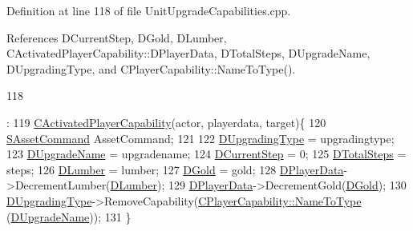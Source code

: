 Definition at line 118 of file Unit\+Upgrade\+Capabilities.\+cpp.



References D\+Current\+Step, D\+Gold, D\+Lumber, C\+Activated\+Player\+Capability\+::\+D\+Player\+Data, D\+Total\+Steps, D\+Upgrade\+Name, D\+Upgrading\+Type, and C\+Player\+Capability\+::\+Name\+To\+Type().


\begin{DoxyCode}
118                                                                                                            
                                                                                                                  
                                                                                        :
119 \hyperlink{classCActivatedPlayerCapability_a1ece00ffb6a7b925c84dd94a7407a0d1}{CActivatedPlayerCapability}(actor, playerdata, target)\{
120     \hyperlink{structSAssetCommand}{SAssetCommand} AssetCommand;
121     
122     \hyperlink{classCPlayerCapabilityUnitUpgrade_1_1CActivatedCapability_a028e222f2adc8a1035090487c93b358b}{DUpgradingType} = upgradingtype;
123     \hyperlink{classCPlayerCapabilityUnitUpgrade_1_1CActivatedCapability_acb0261591d692393b3c864d75edc799f}{DUpgradeName} = upgradename;
124     \hyperlink{classCPlayerCapabilityUnitUpgrade_1_1CActivatedCapability_a3ffaf9372ee622c3ef439396dfd00db6}{DCurrentStep} = 0;
125     \hyperlink{classCPlayerCapabilityUnitUpgrade_1_1CActivatedCapability_a56d9f9fd76c8757955e84ae8f56d5337}{DTotalSteps} = steps;
126     \hyperlink{classCPlayerCapabilityUnitUpgrade_1_1CActivatedCapability_aa4de5f57ea9d8dd85d7e6f62015c4a8d}{DLumber} = lumber;
127     \hyperlink{classCPlayerCapabilityUnitUpgrade_1_1CActivatedCapability_a259a99f41ef918edf79f6827dec06559}{DGold} = gold;
128     \hyperlink{classCActivatedPlayerCapability_a9bf27c322a73f4b11c8183cc1973c3d8}{DPlayerData}->DecrementLumber(\hyperlink{classCPlayerCapabilityUnitUpgrade_1_1CActivatedCapability_aa4de5f57ea9d8dd85d7e6f62015c4a8d}{DLumber});
129     \hyperlink{classCActivatedPlayerCapability_a9bf27c322a73f4b11c8183cc1973c3d8}{DPlayerData}->DecrementGold(\hyperlink{classCPlayerCapabilityUnitUpgrade_1_1CActivatedCapability_a259a99f41ef918edf79f6827dec06559}{DGold});
130     \hyperlink{classCPlayerCapabilityUnitUpgrade_1_1CActivatedCapability_a028e222f2adc8a1035090487c93b358b}{DUpgradingType}->RemoveCapability(\hyperlink{classCPlayerCapability_a920a696526e8a839f728192aea0ba1c5}{CPlayerCapability::NameToType}
      (\hyperlink{classCPlayerCapabilityUnitUpgrade_1_1CActivatedCapability_acb0261591d692393b3c864d75edc799f}{DUpgradeName}));
131 \}
\end{DoxyCode}
